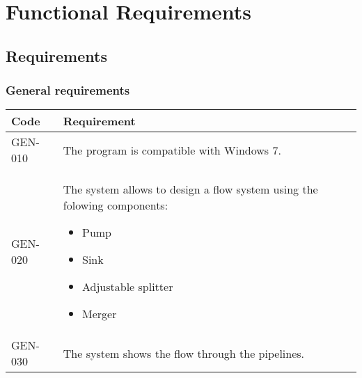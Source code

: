 \chapter{Functional Requirements}
\section{Requirements}
\subsection{General requirements}
\begin{tabularx}{\textwidth}{|p{2cm}X|}\hline
Code & Requirement \\\hline
GEN-010 & The program is compatible with Windows 7.\\\hline
GEN-020 & The system allows to design a flow system using the folowing components:
\begin{itemize}[noitemsep,nolistsep]
\item Pump
\item Sink
\item Adjustable splitter 
\item Merger
\end{itemize}
\\\hline
GEN-030 & The system shows the flow through the pipelines.\\\hline
\end{tabularx}


